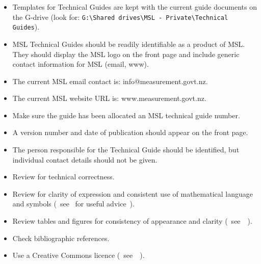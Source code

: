 \begin{itemize}
\item Templates for Technical Guides are kept with the current guide documents on the G-drive (look for: 
\verb|G:\Shared drives\MSL - Private\Technical Guides|).
\item MSL Technical Guides should be readily identifiable as a product of MSL. They should display the MSL logo on the front page and include generic contact information for MSL (email, www). 
\item  The current MSL email contact is: info@measurement.govt.nz.
\item  The current MSL website URL is: www.measurement.govt.nz.
\item  Make sure the guide has been allocated an MSL technical guide number.
\item  A version number and date of publication should appear on the front page.
\item  The person responsible for the Technical Guide should be identified, but individual contact details should not be given.
\item  Review for technical correctness.
\item  Review for clarity of expression and consistent use of mathematical language and symbols (~see~\cite[\S\ref*{GRP-s:scientific_documents}]{MSL_Reporting_Guidelines} for useful advice~).
\item  Review tables and figures for consistency of appearance and clarity (~see~\cite[\S\ref*{GRP-s:scientific_documents}]{MSL_Reporting_Guidelines}~).
\item  Check bibliographic references. 
\item  Use a Creative Commons licence (~see~\cite[\S\ref*{GRP-s_copyright}]{MSL_Reporting_Guidelines}~).
\end{itemize}

